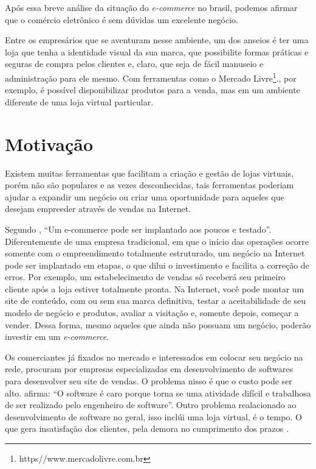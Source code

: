 \documentclass[a4paper,12pt]{monografia}
\begin{document}
Após essa breve análise da situação do \textit{e-commerce} no brasil, podemos afirmar que o comércio eletrônico é sem dúvidas um excelente negócio. 

Entre os empresários que se aventuram nesse ambiente, um dos anseios é ter uma loja que tenha a identidade visual da sua marca, que possibilite formas práticas e seguras de compra pelos clientes e, claro, que seja de fácil manuseio e administração para ele mesmo. Com ferramentas como o Mercado Livre\footnote{https//www.mercadolivre.com.br}., por exemplo, é possível disponibilizar produtos para a venda, mas em um ambiente diferente de uma loja virtual particular.

\section{Motivação} %
\label{sec:motivacao}

Existem muitas ferramentas que facilitam a criação e gestão de lojas virtuais, porém não são populares e as vezes desconhecidas, tais ferramentas poderiam ajudar a expandir um negócio ou criar uma oportunidade para aqueles que desejam empreeder através de vendas na Internet. 

Segundo , ``Um e-commerce pode ser implantado aos poucos e testado''. Diferentemente de uma empresa tradicional, em que o início das operações ocorre somente com o empreendimento totalmente estruturado, um negócio na Internet pode ser implantado em etapas, o que dilui o investimento e facilita a correção de erros. Por exemplo, um estabelecimento de vendas só receberá seu primeiro cliente após a loja estiver totalmente pronta. Na Internet, você pode montar um site de conteúdo, com ou sem sua marca definitiva, testar a aceitabilidade de seu modelo de negócio e produtos, avaliar a visitação e, somente depois, começar a vender. Dessa forma, mesmo aqueles que ainda não possuam um negócio, poderão investir em um \textit{e-commerce}.

Os comerciantes já fixados no mercado e interessados em colocar seu negócio na rede, procuram por empresas especializadas em desenvolvimento de softwares para desenvolver seu site de vendas. O problema nisso é que o custo pode ser alto.  afirma: ``O software é caro porque torna se uma atividade difícil e trabalhosa de ser realizado pelo engenheiro de software''.  Outro problema realacionado ao desenvolvimento de software no geral, isso inclúi uma loja virtual, é o tempo. O que gera insatisfação dos clientes, pela demora no cumprimento dos prazos \cite{pressman}.
\end{document}
